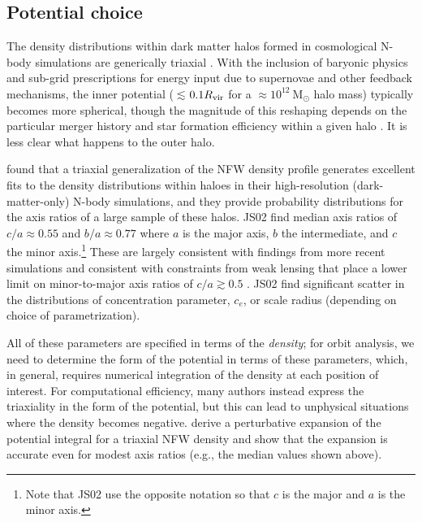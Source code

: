 \documentclass[letterpaper,12pt,preprint]{aastex}
\newcommand{\msun}{\ensuremath{\mathrm{M}_\odot}}
\begin{document}
\subsection{Potential choice}\label{sec:potential}

The density distributions within dark matter halos formed in cosmological N-body simulations are generically triaxial \citep[e.g.,][]{jing02, bett07, zemp09, veraciro11}. With the inclusion of baryonic physics and sub-grid prescriptions for energy input due to supernovae and other feedback mechanisms, the inner potential ($\lesssim$$0.1R_{\rm vir}$ for a $\approx$$10^{12}~\msun$ halo mass) typically becomes more spherical, though the magnitude of this reshaping depends on the particular merger history and star formation efficiency within a given halo \citep[e.g.,][though in Milky Way-like galaxies, baryonic disks will add non-sphericity to the total potential]{dubinski94,kazantzidis04, bryan13, butsky15}. It is less clear what happens to the outer halo.

 \citet[][hereafter JS02]{jing02} found that a triaxial generalization of the NFW density profile \citep{navarro96} generates excellent fits to the density distributions within haloes in their high-resolution (dark-matter-only) N-body simulations, and they provide probability distributions for the axis ratios of a large sample of these halos. JS02 find median axis ratios of $c/a \approx 0.55$ and $b/a \approx 0.77$ where $a$ is the major axis, $b$ the intermediate, and $c$ the minor axis.\footnote{Note that JS02 use the opposite notation so that $c$ is the major and $a$ is the minor axis.} These are largely consistent with findings from more recent simulations \citep[e.g.,][]{bett07, veraciro11, butsky15} and consistent with constraints from weak lensing that place a lower limit on minor-to-major axis ratios of $c/a\gtrsim0.5$ \citep{vanuitert12}. JS02 find significant scatter in the distributions of concentration parameter, $c_e$, or scale radius (depending on choice of parametrization). 

All of these parameters are specified in terms of the \emph{density}; for orbit analysis, we need to determine the form of the potential in terms of these parameters, which, in general, requires numerical integration of the density at each position of interest. For computational efficiency, many authors instead express the triaxiality in the form of the potential, but this can lead to unphysical situations where the density becomes negative. \citet{leesuto03} derive a perturbative expansion of the potential integral for a triaxial NFW density and show that the expansion is accurate even for modest axis ratios (e.g., the median values shown above). 
\end{document}

